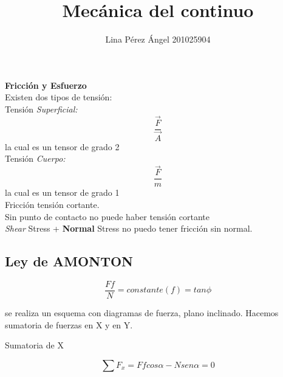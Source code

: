 \documentclass[12pt]{article}
\title{Mec\'anica del continuo}
\author{Lina P\'erez \'Angel 201025904}
\begin{document}
\maketitle
\textbf {Fricci\'on y Esfuerzo}\\


Existen dos tipos de tensi\'on: \\
Tensi\'on \textit{Superficial:}\\
\begin{equation}\label{eq:1.1}
\dfrac{\vec{F}}{\vec{A}}
\end{equation}
la cual es un tensor de grado 2\textdegree \\



Tensi\'on \textit{Cuerpo:}\\
\begin{equation}\label{eq:1.2}
\dfrac{\vec{F}}{m}
\end{equation}
la cual es un tensor de grado 1\textdegree \\



Fricci\'on \textrightarrow tensi\'on cortante.\\

Sin punto de contacto no puede haber tensi\'on cortante\\

\textsl{Shear} Stress + \textbf{Normal} Stress \textrightarrow no puedo tener fricci\'on sin normal. 



\begin{large}
 \section {\textbf{Ley de AMONTON} }
\end{large}

\begin{equation}
 \dfrac{Ff}{N} = constante (\textit{f}) = tan \phi
\end{equation}

se realiza un esquema con diagramas de fuerza, plano inclinado. Hacemos sumatoria de fuerzas en X y en Y.\\

\begin{large}
 \textup{Sumatoria de X}
\end{large}

\begin{equation}
 \sum F_{x} = Ffcos\alpha - Nsen\alpha = 0
\end{equation}
\end{document}
